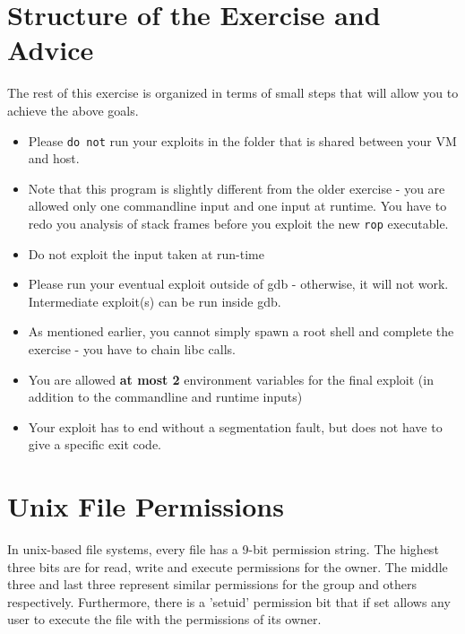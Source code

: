 \documentclass[a4paper,11pt]{article}
\begin{document}
\section*{Structure of the Exercise and Advice}
The rest of this exercise is organized in terms of small steps that will allow
you to achieve the above goals.

\begin{itemize}
\item Please \texttt{do not} run your exploits in the folder that is shared
  between your VM and host.
\item Note that this program is slightly different from the older exercise - you
  are allowed only one commandline input and one input at runtime. You have to
  redo you analysis of stack frames before you exploit the new \texttt{rop}
  executable.
\item Do not exploit the input taken at run-time
\item Please run your eventual exploit outside of gdb - otherwise, it will not
  work. Intermediate exploit(s) can be run inside gdb.
\item As mentioned earlier, you cannot simply spawn a root shell and complete
  the exercise - you have to chain libc calls.
\item You are allowed \textbf{at most 2} environment variables for the final
  exploit (in addition to the commandline and runtime inputs)
\item Your exploit has to end without a segmentation fault, but does not have to
give a specific exit code.
\end{itemize}

\section*{Unix File Permissions}
In unix-based file systems, every file has a 9-bit permission string. The highest
three bits are for read, write and execute permissions for the owner.  The middle
three and last three represent similar permissions for the group and others
respectively. Furthermore, there is a 'setuid' permission bit that if set allows
any user to execute the file with the permissions of its owner.
\end{document}
